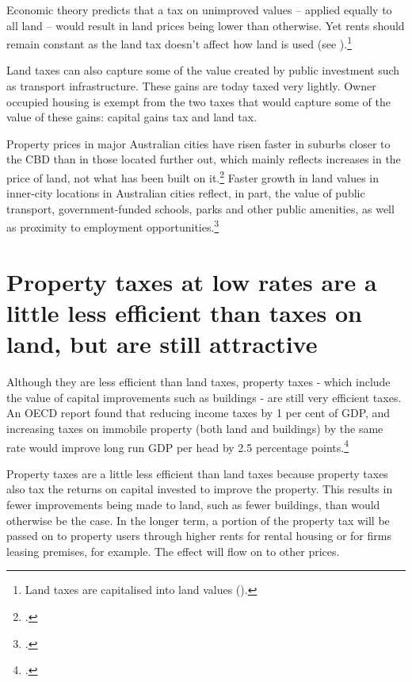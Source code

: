\documentclass[twoside,english]{grattanBudgetRepairb5portrait}
\begin{document}
Economic theory predicts that a tax on unimproved values – applied equally to all land – would result in land prices being lower than otherwise. Yet rents should remain constant as the land tax doesn’t affect how land is used (see ).\footnote{Land taxes are capitalised into land values (\textcite[][247--248]{HenryTaxReview2010}).}   

Land taxes can also capture some of the value created by public investment such as transport infrastructure. These gains are today taxed very lightly. Owner occupied housing is exempt from the two taxes that would capture some of the value of these gains: capital gains tax and land tax. 

Property prices in major Australian cities have risen faster in suburbs closer to the CBD than in those located further out, which mainly reflects increases in the price of land, not what has been built on it.\footcite[][22]{KulishRichardsGillitzer2011}  Faster growth in land values in inner-city locations in Australian cities reflect, in part, the value of public transport, government-funded schools, parks and other public amenities, as well as proximity to employment opportunities.\footcite[][87]{KellyDonegan2015}

\section{Property taxes at low rates are a little less efficient than taxes on land, but are still attractive\label{sec:PROP-4-2}}
Although they are less efficient than land taxes, property taxes - which include the value of capital improvements such as buildings - are still very efficient taxes. An OECD report found that reducing income taxes by 1 per cent of GDP, and increasing taxes on immobile property (both land and buildings) by the same rate would improve long run GDP per head by 2.5 percentage points.\footcite[][58]{JohanssonHeadyArnoldEtAl2008}

Property taxes are a little less efficient than land taxes because property taxes also tax the returns on capital invested to improve the property. This results in fewer improvements being made to land, such as fewer buildings, than would otherwise be the case. In the longer term, a portion of the property tax will be passed on to property users through higher rents for rental housing or for firms leasing premises, for example. The effect will flow on to other prices.
\end{document}
